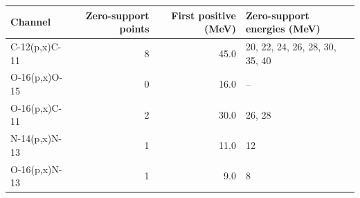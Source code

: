 \begin{tabular}{lrrl}
\toprule
Channel & Zero-support points & First positive (MeV) & Zero-support energies (MeV) \\
\midrule
C-12(p,x)C-11 & 8 & 45.0 & 20, 22, 24, 26, 28, 30, 35, 40 \\
O-16(p,x)O-15 & 0 & 16.0 & -- \\
O-16(p,x)C-11 & 2 & 30.0 & 26, 28 \\
N-14(p,x)N-13 & 1 & 11.0 & 12 \\
O-16(p,x)N-13 & 1 & 9.0 & 8 \\
\bottomrule
\end{tabular}
